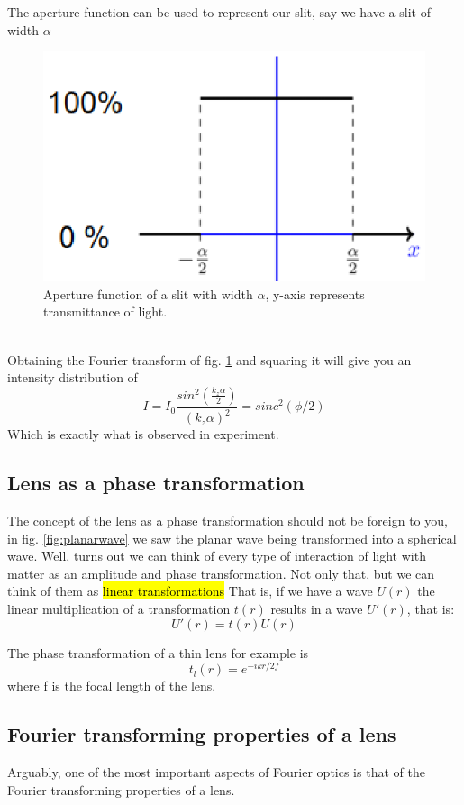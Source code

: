 \documentclass{article}
\begin{document}
The aperture function can be used to represent our slit, say we have a slit of width $\alpha$
\begin{figure}[!phbt]
    \centering
    \includegraphics[width=0.4\linewidth]{img/Aperture.eps}
    \caption{Aperture function of a slit with width $\alpha$, y-axis represents transmittance of light.}
    \label{fig:aperture}
\end{figure}
\\
Obtaining the Fourier transform of fig. \ref{fig:aperture} and squaring it will give you an intensity distribution of 
\begin{equation}
    I = I_0 \frac{sin^2(\frac{k_z\alpha}{2})}{(k_z\alpha)^2} = sinc^2(\phi/2)
\end{equation}
Which is exactly what is observed in experiment.
\subsection{Lens as a phase transformation}
 The concept of the lens as a phase transformation should not be foreign to you, in fig. \ref{fig:planarwave} we saw the planar wave being transformed into a spherical wave.
 Well, turns out we can think of every type of interaction of light with matter as an amplitude and phase transformation. Not only that, but we can think of them as \hl{linear transformations}
 That is, if we have a wave $U(r)$ the linear multiplication of a transformation $t(r)$ results in a wave $U'(r)$, that is:
 \begin{equation}
     U'(r) = t(r)U(r)
 \end{equation}
 
The phase transformation of a thin lens for example is
 \begin{equation}
     t_l(r) = e^{-ikr/2f}
 \end{equation}
where f is the focal length of the lens.
 
\subsection{Fourier transforming properties of a lens}
Arguably, one of the most important aspects of Fourier optics is that of the Fourier transforming properties of a lens.
\end{document}
